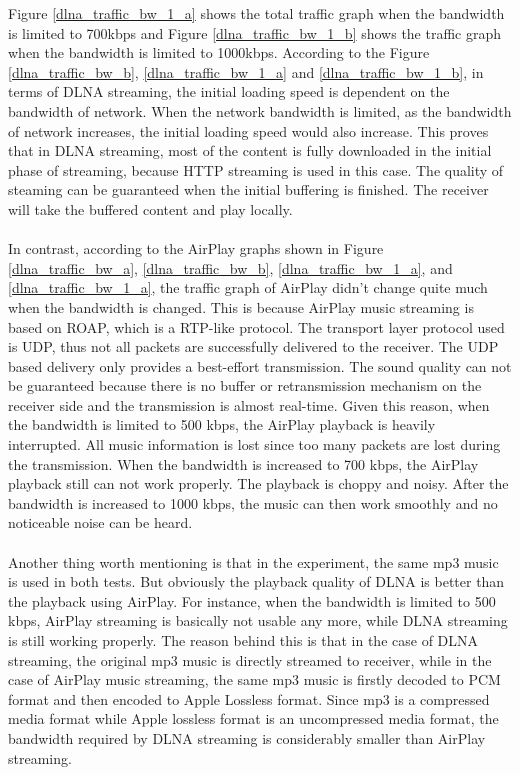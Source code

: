 Figure \ref{dlna_traffic_bw_1_a} shows the total traffic graph when the bandwidth is limited to 700kbps and Figure \ref{dlna_traffic_bw_1_b} shows the traffic graph when the bandwidth is limited to 1000kbps. According to the Figure \ref{dlna_traffic_bw_b}, \ref{dlna_traffic_bw_1_a} and \ref{dlna_traffic_bw_1_b}, in terms of DLNA streaming, the initial loading speed is dependent on the bandwidth of network. When the network bandwidth is limited, as the bandwidth of network increases, the initial loading speed would also increase. This proves that in DLNA streaming, most of the content is fully downloaded in the initial phase of streaming, because HTTP streaming is used in this case. The quality of steaming can be guaranteed when the initial buffering is finished. The receiver will take the buffered content and play locally.\\
\\
In contrast, according to the AirPlay graphs shown in Figure
\ref{dlna_traffic_bw_a}, \ref{dlna_traffic_bw_b}, \ref{dlna_traffic_bw_1_a}, and \ref{dlna_traffic_bw_1_a}, the traffic graph of AirPlay didn't change quite much when the bandwidth is changed. This is because AirPlay music streaming is based on ROAP, which is a RTP-like protocol. The transport layer protocol used is UDP, thus not all packets are successfully delivered to the receiver. The UDP based delivery only provides a best-effort transmission. The sound quality can not be guaranteed because there is no buffer or retransmission mechanism on the receiver side and the transmission is almost real-time. Given this reason, when the bandwidth is limited to 500 kbps, the AirPlay playback is heavily interrupted. All music information is lost since too many packets are lost during the transmission. When the bandwidth is increased to 700 kbps, the AirPlay playback still can not work properly. The playback is choppy and noisy. After the bandwidth is increased to 1000 kbps, the music can then work smoothly and no noticeable noise can be heard.\\
\\
Another thing worth mentioning is that in the experiment, the same mp3 music is used in both tests. But obviously the playback quality of DLNA is better than the playback using AirPlay. For instance, when the bandwidth is limited to 500 kbps, AirPlay streaming is basically not usable any more, while DLNA streaming is still working properly. The reason behind this is that in the case of DLNA streaming, the original mp3 music is directly streamed to receiver, while in the case of AirPlay music streaming, the same mp3 music is firstly decoded to PCM format and then encoded to Apple Lossless format. Since mp3 is a compressed media format while Apple lossless format is an uncompressed media format, the bandwidth required by DLNA streaming is considerably smaller than AirPlay streaming.\\
